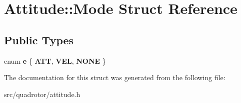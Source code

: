 \hypertarget{structAttitude_1_1Mode}{
\section{Attitude::Mode Struct Reference}
\label{structAttitude_1_1Mode}
}
\subsection*{Public Types}
\begin{DoxyCompactItemize}
\item 
enum {\bfseries e} \{ {\bfseries ATT}, 
{\bfseries VEL}, 
{\bfseries NONE}
 \}
\end{DoxyCompactItemize}


The documentation for this struct was generated from the following file:\begin{DoxyCompactItemize}
\item 
src/quadrotor/attitude.h\end{DoxyCompactItemize}
